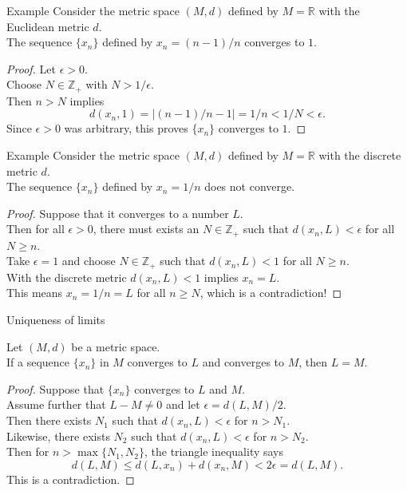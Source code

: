 \documentclass{beamer}
\begin{document}
\begin{frame}{Example}
Consider the metric space $(M,d)$ defined by $M=\mathbb{R}$ with the Euclidean metric $d$.\\
\pause
The sequence $\{x_n\}$ defined by $x_n = (n-1)/n$ converges to $1$.\\
\pause
\begin{proof}
\pause
Let $\epsilon > 0$.\\
\pause
Choose $N\in\mathbb{Z}_+$ with $N > 1/\epsilon$.\\
\pause
Then $n>N$ implies
$$d(x_n,1) = |(n-1)/n-1| = 1/n < 1/N < \epsilon.$$
\pause
Since $\epsilon > 0$ was arbitrary, this proves $\{x_n\}$ converges to $1$.
\end{proof}
\end{frame}

\begin{frame}{Example}
Consider the metric space $(M,d)$ defined by $M=\mathbb{R}$ with the {\color{red} discrete} metric $d$.\\
\pause
The sequence $\{x_n\}$ defined by $x_n = 1/n$ does not converge.\\
\pause
\begin{proof}
\pause
Suppose that it converges to a number $L$.\\
\pause
Then for all $\epsilon > 0$, there must exists an $N\in\mathbb{Z}_+$ such that $d(x_n,L) < \epsilon$ for all $N\geq n$.\\
\pause
Take $\epsilon = 1$ and choose $N\in\mathbb{Z}_+$ such that $d(x_n,L) < 1$ for all $N\geq n$.\\
\pause
With the discrete metric $d(x_n,L) < 1$ implies $x_n = L$.\\
\pause
This means $x_n=1/n = L$ for all $n\geq N$, which is a contradiction!
\end{proof}
\end{frame}

\begin{frame}{Uniqueness of limits}
\begin{thm}
\pause
Let $(M,d)$ be a metric space.\\
\pause
If a sequence $\{x_n\}$ in $M$ converges to $L$ and converges to $M$, then $L=M$.
\end{thm}
\pause
\begin{proof}
\pause
Suppose that $\{x_n\}$ converges to $L$ and $M$.\\
\pause
Assume further that $L-M\neq 0$ and let $\epsilon = d(L,M)/2$.\\
\pause
Then there exists $N_1$ such that $d(x_n,L) < \epsilon$ for $n > N_1$.\\
\pause
Likewise, there exists $N_2$ such that $d(x_n,L) < \epsilon$ for $n > N_2$.\\
\pause
Then for $n>\max\{N_1,N_2\}$,  the triangle inequality says
\pause
$$d(L,M) \leq d(L,x_n) + d(x_n,M) < 2\epsilon = d(L,M).$$
\pause
This is a contradiction.
\end{proof}
\end{frame}
\end{document}
